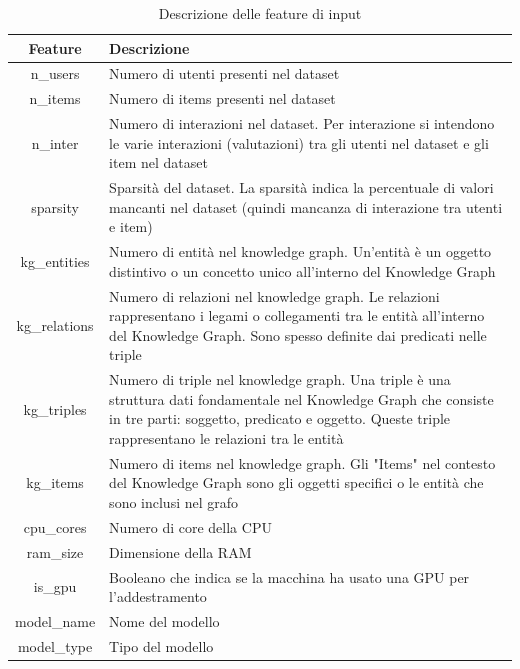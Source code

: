 \begin{center}
\begin{table}[H]
    \centering
    \begin{tabularx}{\textwidth}{|c|X|}
        \hline
        \textbf{Feature} & \textbf{Descrizione} \\
        \hline
        n\_users & Numero di utenti presenti nel dataset \\
        \hline
        n\_items & Numero di items presenti nel dataset \\
        \hline
        n\_inter & Numero di interazioni nel dataset. Per interazione si intendono le varie interazioni (valutazioni) tra gli utenti nel dataset e gli item nel dataset \\
        \hline
        sparsity & Sparsità del dataset. La sparsità indica la percentuale di valori mancanti nel dataset (quindi mancanza di interazione tra utenti e item)\\
        \hline
        kg\_entities & Numero di entità nel knowledge graph. Un'entità è un oggetto distintivo o un concetto unico all'interno del Knowledge Graph \\
        \hline
        kg\_relations & Numero di relazioni nel knowledge graph. Le relazioni rappresentano i legami o collegamenti tra le entità all'interno del Knowledge Graph. Sono spesso definite dai predicati nelle triple \\
        \hline
        kg\_triples & Numero di triple nel knowledge graph. Una triple è una struttura dati fondamentale nel Knowledge Graph che consiste in tre parti: soggetto, predicato e oggetto. Queste triple rappresentano le relazioni tra le entità \\
        \hline
        kg\_items & Numero di items nel knowledge graph. Gli "Items" nel contesto del Knowledge Graph sono gli oggetti specifici o le entità che sono inclusi nel grafo \\
        \hline
        cpu\_cores & Numero di core della CPU \\
        \hline
        ram\_size & Dimensione della RAM \\
        \hline
        is\_gpu & Booleano che indica se la macchina ha usato una GPU per l'addestramento \\
        \hline
        model\_name & Nome del modello \\
        \hline
        model\_type & Tipo del modello \\
        \hline
    \end{tabularx}
    \caption{Descrizione delle feature di input}
\end{table}
\end{center}

